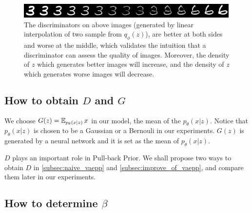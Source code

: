 \begin{figure}[tb]
	\centering
	\includegraphics[width=0.9\columnwidth]{../figures/interpolate}
	\caption{
	The discriminators on above images (generated by linear interpolation of two sample from $q_\phi(z)$), are better at both sides and worse at the middle, which validates the intuition that a discriminator can assess the quality of images. Moreover, the density of $z$ which generates better images will increase, and the density of $z$ which generates worse images will decrease. 
	}
	\label{fig:interpolate}
\end{figure}

\subsection{How to obtain $D$ and $G$}\label{subsec:determine_D_and_G}
We choose $G(z) = \operatorname{\mathbb{E}}_{p_\theta(x|z)} x$ in our model, \IE the mean of the $p_\theta(x|z)$. Notice that $p_\theta(x|z)$ is chosen to be a Gaussian or a Bernouli in our experiments. $G(z)$ is generated by a neural network and it is set as the mean of $p_\theta(x|z)$. 

$D$ plays an important role in Pull-back Prior. We shall propose two ways to obtain $D$ in \cref{subsec:naive_vaepp} and \cref{subsec:improve_of_vaepp}, and compare them later in our experiments. 

\subsection{How to determine $\beta$}\label{subsec:determine_beta}

